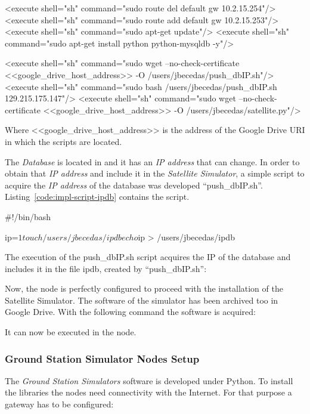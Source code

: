 \begin{itemize}
\begin{listing}[
  float=h!,
  caption  = {RSPEC specification for \emph{Satellite Simulators}},
  label    = code:impl-rspec-sat-sim,
  style=customc]
<execute shell="sh" command="sudo route del default gw 10.2.15.254"/>
<execute shell="sh" command="sudo route add default gw 10.2.15.253"/>
<execute shell="sh" command="sudo apt-get update"/>
<execute shell="sh" command="sudo apt-get install python python-mysqldb -y"/>

<execute shell="sh" command="sudo wget --no-check-certificate <<google_drive_host_address>> -O
/users/jbecedas/push_dbIP.sh"/>
<execute shell="sh" command="sudo bash /users/jbecedas/push_dbIP.sh 129.215.175.147"/>
<execute shell="sh" command="sudo wget --no-check-certificate
<<google_drive_host_address>> -O /users/jbecedas/satellite.py"/>
\end{listing}


Where <<google_drive_host_address>> is the address of the Google Drive URI in which the scripts are located.

The \emph{Database} is located in \bonfire and it has an \emph{IP address} that can change. In order to
obtain that \emph{IP address} and include it in the \emph{Satellite Simulator}, a simple script to
acquire the \emph{IP address} of the database was developed ``push_dbIP.sh''.
Listing~\ref{code:impl-script-ipdb} contains the script.

\begin{listing}[
  float=h!,
  caption  = {Bash script to write the Database's\emph{IP address} on a file},
  label    = code:impl-script-ipdb,
  style=customc]

#!/bin/bash

ip=$1

touch /users/jbecedas/ipdb
echo $ip > /users/jbecedas/ipdb
\end{listing}

The execution of the push_dbIP.sh script acquires the IP of the database and includes it in the file ipdb, created by “push_dbIP.sh”:


Now, the node is perfectly configured to proceed with the installation of the Satellite Simulator. The software of the simulator has been archived too in Google Drive. With the following command the software is acquired:

It can now be executed in the node.


\subsubsection{Ground Station Simulator Nodes Setup}


The \emph{Ground Station Simulators} software is developed under Python. To install the libraries the nodes need connectivity with the Internet. For that purpose a gateway has to be configured:


\end{itemize}

